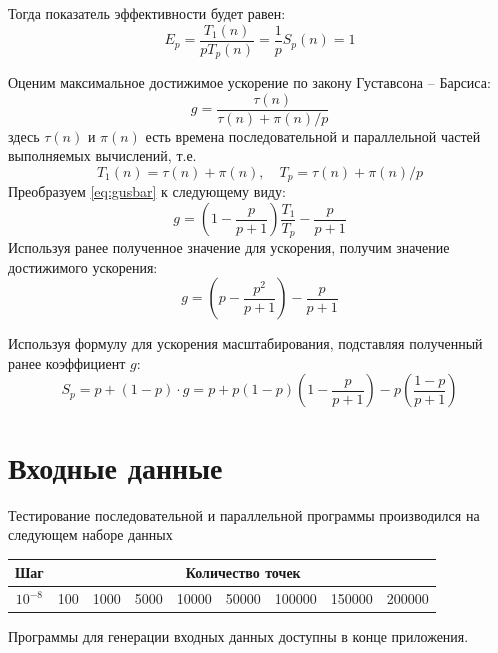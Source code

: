 \documentclass[14pt,final,titlepage,pscyr]{hedwork}
\begin{document}
Тогда показатель эффективности будет равен:
\[
	E_p = \frac{T_1(n)}{pT_p(n)} = \frac{1}{p}S_p(n) = 1
\]

Оценим максимальное достижимое ускорение по закону Густавсона -- Барсиса:
\begin{equation}
	g = \frac{\tau(n)}{\tau(n) + \pi(n) / p}
	\label{eq:gusbar}
\end{equation}
здесь \( \tau(n) \) и \( \pi(n) \) есть времена последовательной и параллельной частей выполняемых 
вычислений, т.е. 
\[
	T_1(n) = \tau(n) + \pi(n), \quad T_p = \tau(n) + \pi(n) / p
\]
Преобразуем \eqref{eq:gusbar} к следующему виду:
\[
	g = \left( 1 - \frac{p}{p+1} \right)\frac{T_1}{T_p} - \frac{p}{p+1}
\]
Используя ранее полученное значение для ускорения, получим значение достижимого ускорения:
\[
	g = \left( p - \frac{p^2}{p+1} \right) - \frac{p}{p+1}
\]

Используя формулу для ускорения масштабирования, подставляя полученный ранее коэффициент \( g \):
\[
	S_p = p + (1-p)\cdot g = p + p \left( 1 - p \right) \left( 1 - \frac{p}{p+1} \right) - 
		p\left( \frac{1-p}{p+1} \right)
\]


\newpage

\section{Входные данные}
Тестирование последовательной и параллельной программы производился на следующем наборе данных
\begin{table}[h]
    \center
	\begin{tabular}{|c|c|c|c|c|c|c|c|c|}
		\hline
		Шаг & \multicolumn{8}{c|}{Количество точек} \\ \hline
		\( 10^{-8} \) & 100 & 1000 & 5000 & 10000 & 50000 & 100000 & 150000 & 200000 \\ 
		\hline
	\end{tabular}
\end{table}

Программы для генерации входных данных доступны в конце приложения.
\end{document}
